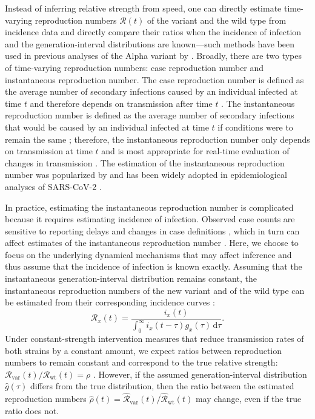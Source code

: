 \documentclass[12pt]{article}
\newcommand{\vvvar}{\mathrm{var}}
\newcommand{\wwwt}{\mathrm{wt}}
\newcommand{\Rx}[1]{\ensuremath{{\mathcal R}_{#1}}\xspace}
\newcommand{\RR}{\ensuremath{{\mathcal R}}\xspace}
\newcommand{\Rw}{\Rx{\wwwt}}
\newcommand{\Rv}{\Rx{\vvvar}}
\newcommand{\dd}[1]{\ensuremath{\, \mathrm{d}#1}}
\newcommand{\dtau}{\dd{\tau}}
\begin{document}
Instead of inferring relative strength from speed, one can directly estimate time-varying reproduction numbers $\RR(t)$ of the variant and the wild type from incidence data and directly compare their ratios when the incidence of infection and the generation-interval distributions are known---such methods have been used in previous analyses of the Alpha variant by \cite{volz2021transmission}.
Broadly, there are two types of time-varying reproduction numbers: case reproduction number and instantaneous reproduction number.
The case reproduction number is defined as the average number of secondary infections caused by an individual infected at time $t$ and therefore depends on transmission after time $t$ \citep{wallinga2004different}.
The instantaneous reproduction number is defined as the average number of secondary infections that would be caused by an individual infected at time $t$ if conditions were to remain the same \citep{fraser2007estimating}; 
therefore, the instantaneous reproduction number only depends on transmission at time $t$ and is most appropriate for real-time evaluation of changes in transmission \citep{gostic2020practical}.
The estimation of the instantaneous reproduction number was popularized by \cite{cori2013new} and has been widely adopted in epidemiological analyses of SARS-CoV-2 \citep{abbott2020estimating,knight2020estimating,flaxman2020Rt,brauner2021inferring,li2021temporal}.

In practice, estimating the instantaneous reproduction number is complicated because it requires estimating incidence of infection.
Observed case counts are sensitive to reporting delays \citep{goldstein2009reconstructing} and changes in case definitions \citep{tsang2020effect}, which in turn can affect estimates of the instantaneous reproduction number \citep{gostic2020practical}.
Here, we choose to focus on the underlying dynamical mechanisms that may affect inference and thus assume that the incidence of infection is known exactly.
Assuming that the instantaneous generation-interval distribution remains constant, the instantaneous reproduction numbers of the new variant and of the wild type can be estimated from their corresponding incidence curves \cite{cori2013new}:
\begin{equation}
\RR_x(t) = \frac{i_x(t)}{\int_0^\infty i_x(t-\tau) g_x(\tau) \dtau}.
\label{eq:rt}
\end{equation}
Under constant-strength intervention measures that reduce transmission rates of both strains by a constant amount, we expect ratios between reproduction numbers to remain constant and correspond to the true relative strength: $\Rv(t)/\Rw(t) = \rho$ \citep{leung2017monitoring,leung2020empirical,di2021impact,leung2021early}.
However, if the assumed generation-interval distribution $\hat{g}(\tau)$ differs from the true distribution, then the ratio between the estimated reproduction numbers $\hat{\rho}(t) = \hat{\RR}_{\textrm{var}}(t)/\hat{\RR}_{\textrm{wt}}(t)$ may change, even if the true ratio does not.
\end{document}
